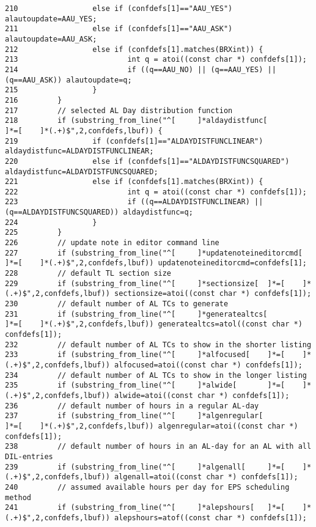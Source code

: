 \begin{verbatim}
210                 else if (confdefs[1]=="AAU_YES") alautoupdate=AAU_YES;
211                 else if (confdefs[1]=="AAU_ASK") alautoupdate=AAU_ASK;
212                 else if (confdefs[1].matches(BRXint)) {
213                         int q = atoi((const char *) confdefs[1]);
214                         if ((q==AAU_NO) || (q==AAU_YES) || (q==AAU_ASK)) alautoupdate=q;
215                 }
216         }
217         // selected AL Day distribution function
218         if (substring_from_line("^[     ]*aldaydistfunc[        ]*=[    ]*(.+)$",2,confdefs,lbuf)) {
219                 if (confdefs[1]=="ALDAYDISTFUNCLINEAR") aldaydistfunc=ALDAYDISTFUNCLINEAR;
220                 else if (confdefs[1]=="ALDAYDISTFUNCSQUARED") aldaydistfunc=ALDAYDISTFUNCSQUARED;
221                 else if (confdefs[1].matches(BRXint)) {
222                         int q = atoi((const char *) confdefs[1]);
223                         if ((q==ALDAYDISTFUNCLINEAR) || (q==ALDAYDISTFUNCSQUARED)) aldaydistfunc=q;
224                 }
225         }
226         // update note in editor command line
227         if (substring_from_line("^[     ]*updatenoteineditorcmd[        ]*=[    ]*(.+)$",2,confdefs,lbuf)) updatenoteineditorcmd=confdefs[1];
228         // default TL section size
229         if (substring_from_line("^[     ]*sectionsize[  ]*=[    ]*(.+)$",2,confdefs,lbuf)) sectionsize=atoi((const char *) confdefs[1]);
230         // default number of AL TCs to generate
231         if (substring_from_line("^[     ]*generatealtcs[        ]*=[    ]*(.+)$",2,confdefs,lbuf)) generatealtcs=atol((const char *) confdefs[1]);
232         // default number of AL TCs to show in the shorter listing
233         if (substring_from_line("^[     ]*alfocused[    ]*=[    ]*(.+)$",2,confdefs,lbuf)) alfocused=atoi((const char *) confdefs[1]);
234         // default number of AL TCs to show in the longer listing
235         if (substring_from_line("^[     ]*alwide[       ]*=[    ]*(.+)$",2,confdefs,lbuf)) alwide=atoi((const char *) confdefs[1]);
236         // default number of hours in a regular AL-day
237         if (substring_from_line("^[     ]*algenregular[         ]*=[    ]*(.+)$",2,confdefs,lbuf)) algenregular=atoi((const char *) confdefs[1]);
238         // default number of hours in an AL-day for an AL with all DIL-entries
239         if (substring_from_line("^[     ]*algenall[     ]*=[    ]*(.+)$",2,confdefs,lbuf)) algenall=atoi((const char *) confdefs[1]);
240         // assumed available hours per day for EPS scheduling method
241         if (substring_from_line("^[     ]*alepshours[   ]*=[    ]*(.+)$",2,confdefs,lbuf)) alepshours=atof((const char *) confdefs[1]);

\end{verbatim}
